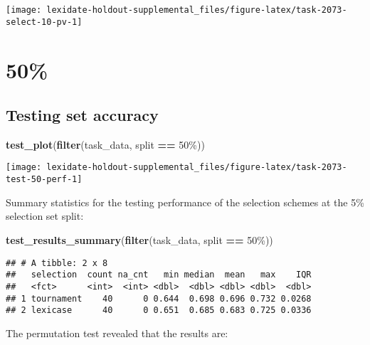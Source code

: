\documentclass[
]{book}
\newenvironment{Shaded}{\begin{snugshade}}{\end{snugshade}}
\newcommand{\FunctionTok}[1]{\textcolor[rgb]{0.13,0.29,0.53}{\textbf{#1}}}
\newcommand{\NormalTok}[1]{#1}
\newcommand{\SpecialCharTok}[1]{\textcolor[rgb]{0.81,0.36,0.00}{\textbf{#1}}}
\newcommand{\StringTok}[1]{\textcolor[rgb]{0.31,0.60,0.02}{#1}}
\begin{document}
\texttt{[image: lexidate-holdout-supplemental\_files/figure-latex/task-2073-select-10-pv-1]}

\hypertarget{section-42}{%
\section{50\%}\label{section-42}}

\hypertarget{testing-set-accuracy-42}{%
\subsection{Testing set accuracy}\label{testing-set-accuracy-42}}

\begin{Shaded}
\begin{Highlighting}[]
\FunctionTok{test\_plot}\NormalTok{(}\FunctionTok{filter}\NormalTok{(task\_data, split }\SpecialCharTok{==} \StringTok{\textquotesingle{}50\%\textquotesingle{}}\NormalTok{))}
\end{Highlighting}
\end{Shaded}

\texttt{[image: lexidate-holdout-supplemental\_files/figure-latex/task-2073-test-50-perf-1]}

Summary statistics for the testing performance of the selection schemes at the 5\% selection set split:

\begin{Shaded}
\begin{Highlighting}[]
\FunctionTok{test\_results\_summary}\NormalTok{(}\FunctionTok{filter}\NormalTok{(task\_data, split }\SpecialCharTok{==} \StringTok{\textquotesingle{}50\%\textquotesingle{}}\NormalTok{))}
\end{Highlighting}
\end{Shaded}

\begin{verbatim}
## # A tibble: 2 x 8
##   selection  count na_cnt   min median  mean   max    IQR
##   <fct>      <int>  <int> <dbl>  <dbl> <dbl> <dbl>  <dbl>
## 1 tournament    40      0 0.644  0.698 0.696 0.732 0.0268
## 2 lexicase      40      0 0.651  0.685 0.683 0.725 0.0336
\end{verbatim}

The permutation test revealed that the results are:
\end{document}
